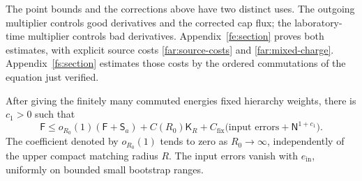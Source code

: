 The point bounds and the corrections above have two distinct uses.
The outgoing multiplier controls good derivatives and the corrected
cap flux; the laboratory-time multiplier controls bad derivatives.
Appendix~\ref{fe:section} proves both estimates, with explicit source
costs \eqref{far:source-costs} and \eqref{far:mixed-charge}.
Appendix~\ref{fs:section} estimates those costs by the ordered
commutations of the equation just verified.

\begin{proposition}\label{far:estimate}
After giving the finitely many commuted energies fixed hierarchy weights,
there is $c_1>0$ such that
\begin{equation}\label{far:far-bound}
 \mathsf F\le o_{R_0}(1)(\mathsf F+\mathsf S_a)
       +C(R_0)\mathsf K_R
       +C_{\mathrm{fix}}\bigl(\text{input errors}
                                      +\mathsf N^{1+c_1}\bigr).
\end{equation}
The coefficient denoted by $o_{R_0}(1)$ tends to zero as $R_0\to\infty$,
independently of the upper compact matching radius $R$.  The input errors
vanish with $e_{\mathrm{in}}$, uniformly on bounded small bootstrap
ranges.
\end{proposition}

